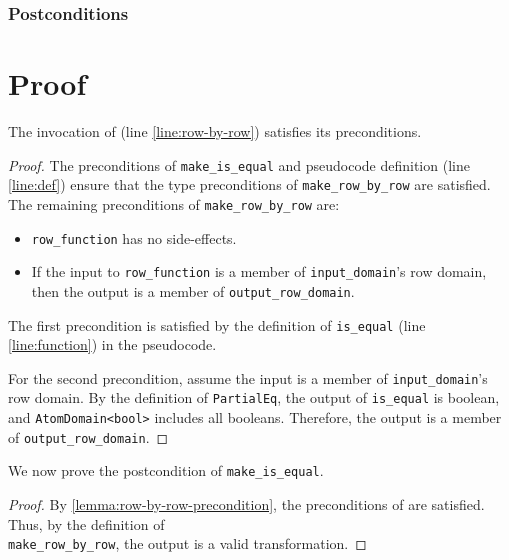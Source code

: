 \documentclass{article}
\begin{document}
\subsubsection*{Postconditions}

\section{Proof}

\begin{lemma}
    The invocation of  (line \ref{line:row-by-row}) satisfies its preconditions.
\end{lemma}

\begin{proof}
    \label{lemma:row-by-row-precondition}
    The preconditions of \texttt{make\_is\_equal} and pseudocode definition (line \ref{line:def}) ensure that the type preconditions of \texttt{make\_row\_by\_row} are satisfied. 
    The remaining preconditions of \texttt{make\_row\_by\_row} are:
    \begin{itemize}
        \item \texttt{row\_function} has no side-effects.
        \item If the input to \texttt{row\_function} is a member of \texttt{input\_domain}'s row domain, then the output is a member of \texttt{output\_row\_domain}.
    \end{itemize}

    The first precondition is satisfied by the definition of \texttt{is\_equal} (line \ref{line:function}) in the pseudocode.

    For the second precondition, assume the input is a member of \texttt{input\_domain}'s row domain. 
    By the definition of \texttt{PartialEq}, the output of \texttt{is\_equal} is boolean, and \texttt{AtomDomain<bool>} includes all booleans.
    Therefore, the output is a member of \texttt{output\_row\_domain}.
\end{proof}

We now prove the postcondition of \texttt{make\_is\_equal}.
\begin{proof}
By \ref{lemma:row-by-row-precondition}, the preconditions of  are satisfied.
Thus, by the definition of \\\texttt{make\_row\_by\_row}, the output is a valid transformation.
\end{proof}
\end{document}
